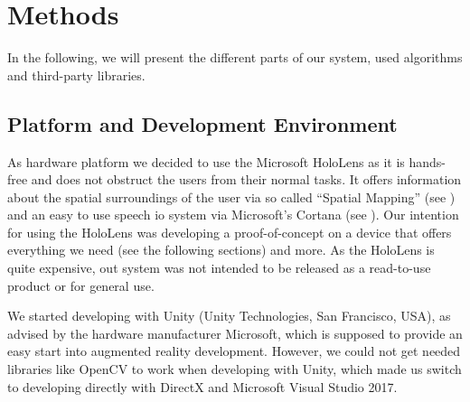 
\section{Methods}
In the following, we will present the different parts of our system, used algorithms and third-party libraries.


\subsection{Platform and Development Environment}
\label{subsec:sucks}
As  hardware platform we decided to use the Microsoft HoloLens as it is hands-free and does not obstruct the users from their normal tasks.
It offers information about the spatial surroundings of the user via so called \enquote{Spatial Mapping} (see ) and an easy to use speech \ac{io} system via Microsoft's Cortana (see ).
Our intention for using the HoloLens was developing a proof-of-concept on a device that offers everything we need (see the following sections) and more.
As the HoloLens is 	quite expensive, out system was not intended to be released as a read-to-use product or for general use.

We started developing with Unity (Unity Technologies, San Francisco, USA), as advised by the hardware manufacturer Microsoft, which is supposed to provide an  easy start into augmented reality development.
However, we could not get needed libraries like OpenCV to work when developing with Unity, which made us switch to developing directly with DirectX and Microsoft Visual Studio 2017.

